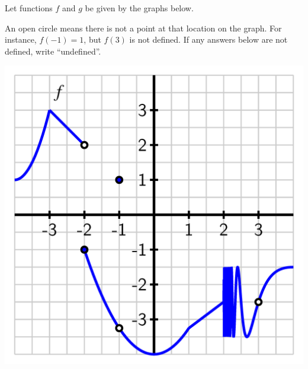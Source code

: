 \documentclass{ximera}
\author{Elizabeth Miller}
\begin{document}
\licenseAPC
\begin{exercise}

Let functions $f$ and $g$ be given by the graphs below. 

An open circle means there is not a point at that location on the
graph.  For instance, $f(-1) = 1$, but $f(3)$ is not defined.  If any
answers below are not defined, write ``undefined''.

\begin{image}
\includegraphics{composite-ez-f.png}
\end{image}


\end{exercise}
\end{document}
